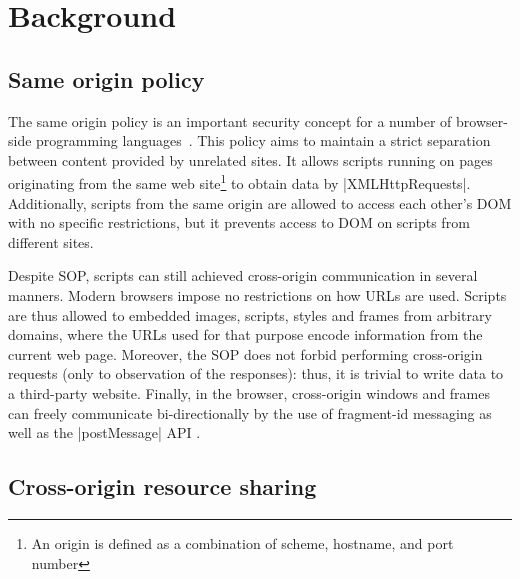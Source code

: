 \section{Background}
\label{sec:background}



\subsection {Same origin policy}

The same origin policy is an important security concept for a number of
browser-side programming languages~\cite{TODO}. This policy aims to maintain a strict
separation between content provided by unrelated sites. It allows scripts
running on pages originating from the same web site\footnote{An origin is
  defined as a combination of scheme, hostname, and port number} to obtain data
by \js|XMLHttpRequests|. Additionally, scripts from the same origin are allowed to
access each other's DOM with no specific restrictions, but it prevents access to
DOM on scripts from different sites. 

Despite SOP, scripts can still achieved cross-origin communication in several
manners. Modern browsers impose no restrictions on how URLs are used. Scripts
are thus allowed to embedded images, scripts, styles and frames from arbitrary
domains, where the URLs used for that purpose encode information from the
current web page. Moreover, the SOP does not forbid performing cross-origin
requests (only to observation of the responses): thus, it is trivial to write
data to a third-party website. Finally, in the browser, cross-origin windows and
frames can freely communicate bi-directionally by the use of fragment-id \cite{TODO}
messaging as well as the \js|postMessage| API \cite{TODO}.



\subsection {Cross-origin resource sharing} 




